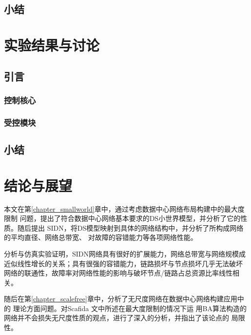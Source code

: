 \documentclass[bachelor,winfonts]{jnuthesis}
\begin{document}
    \section{小结}
    \Blindtext
    
    \chapter{实验结果与讨论}\label{chapter_results}
    \section{引言}
    \Blindtext
    \subsection{控制核心}
    \Blindtext
    \subsection{受控模块}
    \Blindtext
    \section{小结}
    \blindtext
    
    \chapter{结论与展望}\label{chapter_concludes}
    
    本文在第\ref{chapter_smallworld}章中，通过\cite{newman2001structure}考虑数据中心网络布局构建中的最大度限制
    问题，提出了符合数据中心网络基本要求的DS小世界模型，并分析了它的性质。随后提出
    SIDN，将DS模型映射到具体的网络结构中，并分析了所构成网络的平均直径、网络总带宽、
    对故障的容错能力等各项网络性能。
    
    分析与仿真实验证明，SIDN网络具有很好的扩展能力，网络总带宽与网络规模成
    近似线性增长的关系；具有很强的容错能力，链路损坏与节点损坏几乎无法破坏
    网络的联通性，故障率对网络性能的影响与破坏节点/链路占总资源比率线性相关。
    
    随后在第\ref{chapter_scalefree}章中，分析了无尺度网络在数据中心网络构建应用中的
    理论方面问题。对Scafida \cite{gyarmati2010scafida}文中所述在最大度限制的情况下运
    用BA算法构造的网络并不会损失无尺度性质的观点，进行了深入的分析，并指出了该论点的
    局限性。
    
\end{document}
